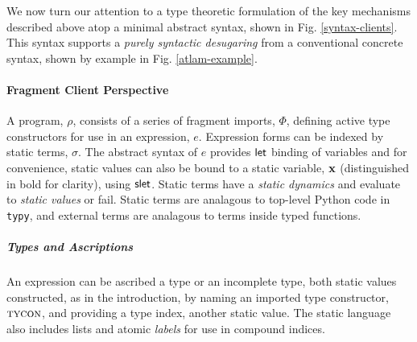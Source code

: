 \documentclass[preprint,10pt]{sigplanconf}
\newcommand{\FF}[1]{{\sf #1}}
\begin{document}


%

We now turn our attention to a type theoretic formulation of the key mechanisms described above atop a minimal abstract syntax, shown in Fig. \ref{syntax-clients}. This syntax supports a \emph{purely syntactic desugaring} from a conventional concrete syntax, shown by example in Fig. \ref{atlam-example}. 

\paragraph{Fragment Client Perspective} A program, $\rho$, consists of a series of fragment imports, $\Phi$, defining active type constructors for use in an expression, $e$. Expression forms can be indexed by static terms, $\sigma$. The abstract syntax of $e$ provides $\FF{let}$ binding of variables and for convenience, static values can also be bound to a static variable, ${\bf x}$ (distinguished in bold for clarity), using $\FF{slet}$. Static terms have a \emph{static dynamics} and evaluate to \emph{static values} or fail. Static terms are analagous to top-level Python code in \verb|typy|, and external terms are analagous to terms inside typed functions.

\subparagraph{Types and Ascriptions} An expression can be ascribed a {type} or an {incomplete type}, both  {static values} constructed, as in the introduction, by naming an imported type constructor, $\textsc{tycon}$, and providing a type index, another static value. The static language also includes lists and atomic \emph{labels} for use in compound indices. %
\end{document}
